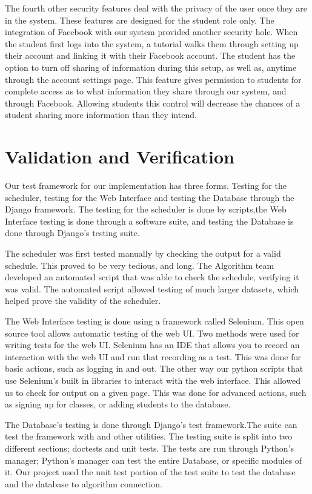 \documentclass[12pt]{article}
\begin{document}
The fourth other security features deal with the privacy of the user once they are in the system. These features are designed for the student role only. The integration of Facebook with our system provided another security hole. When the student first logs into the system, a tutorial walks them through setting up their account and linking it with their Facebook account. The student has the option to turn off sharing of information during this setup, as well as, anytime through the account settings page. This feature gives permission to students for complete access as to what information they share through our system, and through Facebook. Allowing students this control will decrease the chances of a student sharing more information than they intend. %

\section{Validation and Verification} %
Our test framework for our implementation has three forms. Testing for the scheduler, testing for the Web Interface and testing the Database through the Django framework. The testing for the scheduler is done by scripts,the Web Interface testing is done through a software suite, and testing the Database is done through Django's testing suite.

The scheduler was first tested manually by checking the output for a valid schedule. This proved to be very tedious, and long. The Algorithm team developed an automated script that was able to check the schedule, verifying it was valid. The automated script allowed testing of much larger datasets, which helped prove the validity of the scheduler.

The Web Interface testing is done using a framework called Selenium. This open source tool allows automatic testing of the web UI. Two methods were used for writing tests for the web UI. Selenium has an IDE that allows you to record an interaction with the web UI and run that recording as a test. This was done for basic actions, such as logging in and out. The other way our python scripts that use Selenium's built in libraries to interact with the web interface. This allowed us to check for output on a given page. This was done for advanced actions, such as signing up for classes, or adding students to the database.

The Database's testing is done through  Django's test framework.The suite can test the framework with and other utilities. The testing suite is split into two different sections; doctests and unit tests. The tests are run through Python's manager; Python's manager can test the entire Database, or specific modules of it. Our project used the unit test portion of the test suite to test the database and the database to algorithm connection.
\end{document}
